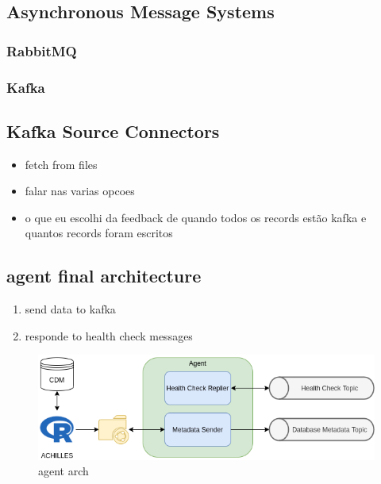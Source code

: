 \subsection{Asynchronous Message Systems}

\subsubsection{RabbitMQ}

\subsubsection{Kafka}


\subsection{Kafka Source Connectors}
\begin{itemize}
    \item fetch from files
    \item falar nas varias opcoes
    \item o que eu escolhi da feedback de quando todos os records estão kafka e quantos records foram escritos
\end{itemize}


\subsection{agent final architecture}
\begin{enumerate}
    \item send data to kafka
    \item responde to health check messages
\end{enumerate}

\begin{figure}[h]
    \center
    \includegraphics[width=\textwidth]{agent-architecture}
    \caption{agent arch}
    \label{fig:agent-architecture}
\end{figure}

